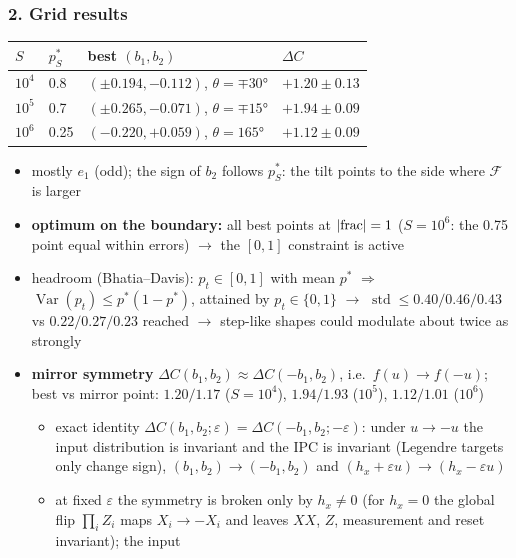\begin{sloppypar}
\subsubsection*{2. Grid results}
\begin{center}
\begin{tabular}{llll}
    \hline
    $S$ & $p^*_S$ & best $(b_1, b_2)$ & $\Delta C$ \\
    \hline
    $10^4$ & 0.8 & $(\pm 0.194, -0.112)$, $\theta = \mp 30°$ & $+1.20 \pm 0.13$ \\
    $10^5$ & 0.7 & $(\pm 0.265, -0.071)$, $\theta = \mp 15°$ & $+1.94 \pm 0.09$ \\
    $10^6$ & 0.25 & $(-0.220, +0.059)$, $\theta = 165°$ & $+1.12 \pm 0.09$ \\
    \hline
\end{tabular}
\end{center}
\begin{itemize}
    \item mostly $e_1$ (odd); the sign of $b_2$ follows $p^*_S$: the tilt points to the side where $\mathcal{F}$ is
    larger
    \item \textbf{optimum on the boundary:} all best points at $\abs{\text{frac}} = 1$ ($S = 10^6$: the 0.75 point
    equal within errors) $\to$ the $[0, 1]$ constraint is active
    \item headroom (Bhatia--Davis): $p_t \in [0, 1]$ with mean $p^*$ $\Rightarrow$
    $\operatorname{Var}(p_t) \le p^*(1 - p^*)$, attained by $p_t \in \{0, 1\}$ $\to$
    $\operatorname{std} \le 0.40 / 0.46 / 0.43$ vs $0.22 / 0.27 / 0.23$ reached $\to$ step-like shapes could
    modulate about twice as strongly
    \item \textbf{mirror symmetry} $\Delta C(b_1, b_2) \approx \Delta C(-b_1, b_2)$, i.e.\ $f(u) \to f(-u)$; best vs
    mirror point: $1.20 / 1.17$ ($S = 10^4$), $1.94 / 1.93$ ($10^5$), $1.12 / 1.01$ ($10^6$)
    \begin{itemize}
        \item exact identity $\Delta C(b_1, b_2; \varepsilon) = \Delta C(-b_1, b_2; -\varepsilon)$: under
        $u \to -u$ the input distribution is invariant and the IPC is invariant (Legendre targets only change
        sign), $(b_1, b_2) \to (-b_1, b_2)$ and $(h_x + \varepsilon u) \to (h_x - \varepsilon u)$
        \item at fixed $\varepsilon$ the symmetry is broken only by $h_x \neq 0$ (for $h_x = 0$ the global flip
        $\prod_i Z_i$ maps $X_i \to -X_i$ and leaves $XX$, $Z$, measurement and reset invariant); the input

\end{itemize}
\end{itemize}
\end{sloppypar}

